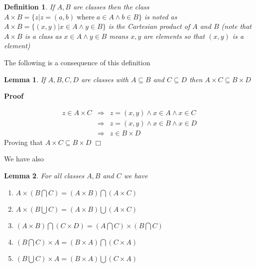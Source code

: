 \documentclass{book}
\newcommand{\nobracket}{}
\newcommand{\tmop}[1]{\ensuremath{\operatorname{#1}}}
\newenvironment{proof}{\noindent\textbf{Proof\ }}{\hspace*{\fill}$\Box$\medskip}
\newtheorem{definition}{Definition}
{\theorembodyfont{\rmfamily}\newtheorem{example}{Example}}
\newtheorem{lemma}{Lemma}
\begin{document}
{{\begin{definition}
  \label{cartesian product}{}If $A, B$ are classes then
  the class $A \times B = \{ z | z = (a, b) \tmop{where} a \in A \wedge b \in
  B \} \nobracket$ is noted as $A \times B = \{ (x, y) | x \in A \wedge y \in
  B \nobracket \}$ is the Cartesian product of $A$ and $B$ (note that $A
  \times B$ is a class as $x \in A \wedge y \in B$ means $x, y$ are elements
  so that $(x, y)$ is a element)
\end{definition}

The following is a consequence of this definition

\begin{lemma}
  \label{product of subclasses}If $A, B, C, D$ are classes with $A \subseteq
  B$ and $C \subseteq D$ then $A \times C \subseteq B \times D$
\end{lemma}

\begin{proof}
  
  \begin{eqnarray*}
    z \in A \times C & \Rightarrow & z = (x, y) \wedge x \in A \wedge x \in
    C\\
    & \Rightarrow & z = (x, y) \wedge x \in B \wedge x \in D\\
    & \Rightarrow & z \in B \times D
  \end{eqnarray*}
  Proving that $A \times C \subseteq B \times D$
\end{proof}

We have also

\begin{lemma}
  \label{product of sets properties}For all classes $A, B$ and $C$ we have
  \begin{enumerate}
    \item $A \times \left( B \bigcap C \right) = (A \times B) \bigcap (A
    \times C)$
    
    \item $A \times \left( B \bigcup C \right) = (A \times B) \bigcup (A
    \times C)$
    
    \item $(A \times B) \bigcap (C \times D) = \left( A \bigcap C \right)
    \times \left( B \bigcap C \right)$
    
    \item $\left( B \bigcap C \right) \times A = (B \times A) \bigcap (C
    \times A)$
    
    \item $\left( B \bigcup C \right) \times A = (B \times A) \bigcup (C
    \times A)$
    

\end{enumerate}
\end{lemma}}}
\end{document}
